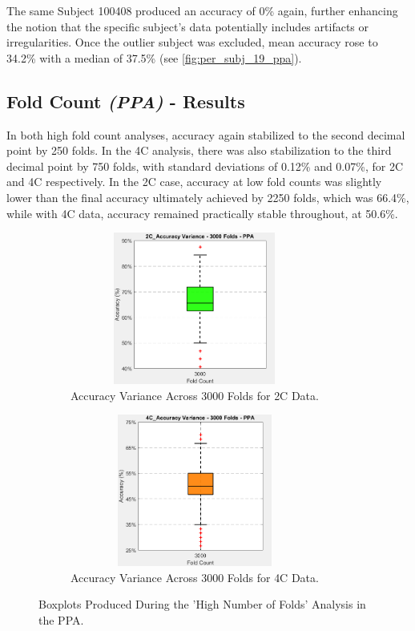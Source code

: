 The same Subject 100408 produced an accuracy of 0\% again, further enhancing the notion that the specific subject's data potentially includes artifacts or irregularities. Once the outlier subject was excluded, mean accuracy rose to 34.2\% with a median of 37.5\% (see \autoref{fig:per_subj_19_ppa}).

\subsection{Fold Count \textit{(PPA)} - Results}

In both high fold count analyses, accuracy again stabilized to the second decimal point by 250 folds. In the \gls{4C} analysis, there was also stabilization to the third decimal point by 750 folds, with standard deviations of 0.12\% and 0.07\%, for \gls{2C} and \gls{4C} respectively. In the \gls{2C} case, accuracy at low fold counts was slightly lower than the final accuracy ultimately achieved by 2250 folds, which was 66.4\%, while with \gls{4C} data, accuracy remained practically stable throughout, at 50.6\%.

\begin{figure}[htbp]
 	\centering
	\begin{subfigure}{0.49\textwidth}
		\centering
		\includegraphics[width = 0.9\textwidth, height = 5cm]{assets/images/box_2C_3000_ppa.png}
		\caption{Accuracy Variance Across 3000 Folds for \gls{2C} Data.}
		\label{fig:2C_3000_ppa}
	\end{subfigure}
	\hfill
	\begin{subfigure}{0.49\textwidth}
		\centering
	 	\includegraphics[width = 0.9\textwidth, height = 5cm]{assets/images/box_4C_3000_ppa.png}
		\caption{Accuracy Variance Across 3000 Folds for \gls{4C} Data.}
		\label{fig:4C_3000_ppa}
	\end{subfigure}
	\caption[Accuracies Across 3000 Folds Boxplots For The PPA]{Boxplots Produced During the 'High Number of Folds' Analysis in the \gls{PPA}.}
 	\label{fig:fold_HN_ppa}
\end{figure}

